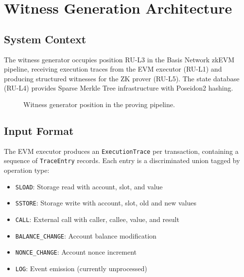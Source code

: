 \documentclass[conference]{IEEEtran}
\begin{document}
\section{Witness Generation Architecture}
\label{sec:architecture}

\subsection{System Context}

The witness generator occupies position RU-L3 in the Basis Network
zkEVM pipeline, receiving execution traces from the EVM executor
(RU-L1) and producing structured witnesses for the ZK prover (RU-L5).
The state database (RU-L4) provides Sparse Merkle Tree infrastructure
with Poseidon2 hashing.

\begin{figure}[htbp]
\centering
{}
\caption{Witness generator position in the proving pipeline.}
\label{fig:pipeline}
\end{figure}

\subsection{Input Format}

The EVM executor produces an \texttt{ExecutionTrace} per transaction,
containing a sequence of \texttt{TraceEntry} records. Each entry is a
discriminated union tagged by operation type:

\begin{itemize}
\item \texttt{SLOAD}: Storage read with account, slot, and value
\item \texttt{SSTORE}: Storage write with account, slot, old and new values
\item \texttt{CALL}: External call with caller, callee, value, and result
\item \texttt{BALANCE\_CHANGE}: Account balance modification
\item \texttt{NONCE\_CHANGE}: Account nonce increment
\item \texttt{LOG}: Event emission (currently unprocessed)
\end{itemize}
\end{document}
